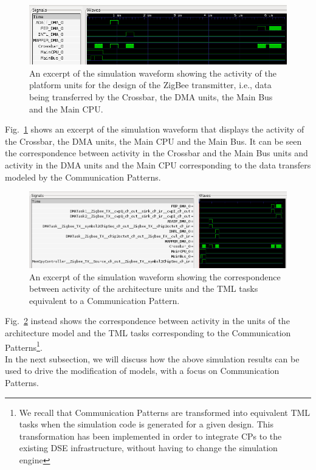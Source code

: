 \documentclass{llncs}
\begin{document}
%
%
\begin{figure}[!htbp]
	\centering
	\includegraphics[width=\textwidth]{figures/Waveform.png}
	\caption{An excerpt of the simulation waveform showing the activity of the platform units for the design of the
    ZigBee transmitter, i.e., data being transferred by the Crossbar, the DMA units, the Main Bus and the Main CPU.}
	\label{fig:Waveform}
\end{figure}
%
Fig.~\ref{fig:Waveform} shows an excerpt of the simulation waveform that displays the activity of the Crossbar, the DMA
units, the Main CPU and the Main Bus. It can be seen the correspondence between activity in the Crossbar and the Main
Bus units and activity in the DMA units and the Main CPU corresponding to the data transfers modeled by the
Communication Patterns.\\
%
\begin{figure}[!htbp]
	\centering
	\includegraphics[width=\textwidth]{figures/Waveform2.png}
	\caption{An excerpt of the simulation waveform showing the correspondence between activity of the architecture
	units and the TML tasks equivalent to a Communication Pattern.}
	\label{fig:Waveform2}
\end{figure}
%
Fig.~\ref{fig:Waveform2} instead shows the correspondence between activity in the units of the architecture model and
the TML tasks corresponding to the Communication Patterns\footnote{We recall that Communication Patterns are transformed
into equivalent TML tasks when the simulation code is generated for a given design. This transformation has been
implemented in order to integrate CPs to the existing DSE infrastructure, without having to change the simulation engine}.\\
%
In the next subsection, we will discuss how the above simulation results can be used to drive the modification of
models, with a focus on Communication Patterns.
%
\end{document}

